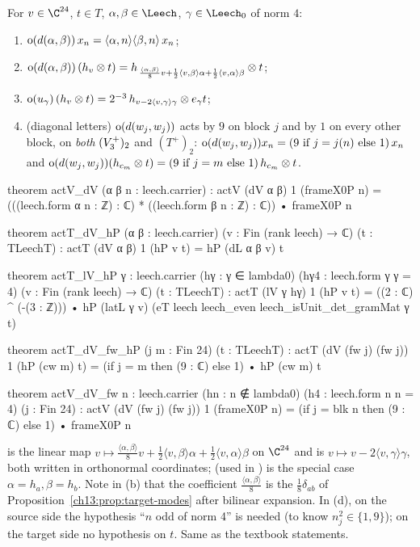 \begin{proposition}\label{ch13:prop:frame-modes}
For $v\in\C^{24}$, $t\in T$, $\alpha,\beta\in\Leech$, $\gamma\in\Leech_0$ of norm $4$:
\begin{enumerate}[label=(\alph*)]
\item $\operatorname{o}(d(\alpha,\beta))\,x_n=\langle\alpha,n\rangle\langle\beta,n\rangle\,x_n$;
\item $\operatorname{o}(d(\alpha,\beta))\,(h_v\otimes t)=h_{\,\frac{\langle\alpha,\beta\rangle}8v+\frac12\langle v,\beta\rangle\alpha+\frac12\langle v,\alpha\rangle\beta}\otimes t$;
\item $\operatorname{o}(u_\gamma)\,(h_v\otimes t)=2^{-3}\,h_{v-2\langle v,\gamma\rangle\gamma}\otimes e_\gamma t$;
\item (diagonal letters) $\operatorname{o}(d(w_j,w_j))$ acts by $9$ on block $j$ and by $1$ on every other
  block, on \emph{both} $(V_3^{+})_2$ and $(T^+)_2$:
  $\operatorname{o}(d(w_j,w_j))x_n=(9\text{ if }j=j(n)\text{ else }1)\,x_n$ and
  $\operatorname{o}(d(w_j,w_j))(h_{c_m}\otimes t)=(9\text{ if }j=m\text{ else }1)\,h_{c_m}\otimes t$.
\end{enumerate}
\end{proposition}
\begin{leancode}
theorem actV_dV (α β n : leech.carrier) :
    actV (dV α β) 1 (frameX0P n)
      = (((leech.form α n : ℤ) : ℂ) * ((leech.form β n : ℤ) : ℂ)) • frameX0P n

theorem actT_dV_hP (α β : leech.carrier) (v : Fin (rank leech) → ℂ) (t : TLeechT) :
    actT (dV α β) 1 (hP v t) = hP (dL α β v) t

theorem actT_lV_hP {γ : leech.carrier} (hγ : γ ∈ lambda0) (hγ4 : leech.form γ γ = 4)
    (v : Fin (rank leech) → ℂ) (t : TLeechT) :
    actT (lV γ hγ) 1 (hP v t)
      = ((2 : ℂ) ^ (-(3 : ℤ))) • hP (latL γ v) (eT leech leech_even leech_isUnit_det_gramMat γ t)

theorem actT_dV_fw_hP (j m : Fin 24) (t : TLeechT) :
    actT (dV (fw j) (fw j)) 1 (hP (cw m) t) = (if j = m then (9 : ℂ) else 1) • hP (cw m) t

theorem actV_dV_fw {n : leech.carrier} (hn : n ∉ lambda0) (h4 : leech.form n n = 4) (j : Fin 24) :
    actV (dV (fw j) (fw j)) 1 (frameX0P n) = (if j = blk n then (9 : ℂ) else 1) • frameX0P n
\end{leancode}
\begin{dictionary}
 is the linear map $v\mapsto\frac{\langle\alpha,\beta\rangle}8v+\frac12\langle v,\beta\rangle\alpha+\frac12\langle
v,\alpha\rangle\beta$ on $\C^{24}$ and  is $v\mapsto v-2\langle v,\gamma\rangle\gamma$, both written in
orthonormal coordinates;  (used in ) is the special case
$\alpha=h_a,\beta=h_b$. Note in (b) that the coefficient $\frac{\langle\alpha,\beta\rangle}8$ is the
$\tfrac18\delta_{ab}$ of Proposition~\ref{ch13:prop:target-modes} after bilinear expansion. In (d), on the
source side the hypothesis ``$n$ odd of norm 4'' is needed (to know $n_j^2\in\{1,9\}$); on the target
side no hypothesis on $t$. Same as the textbook statements.
\end{dictionary}
